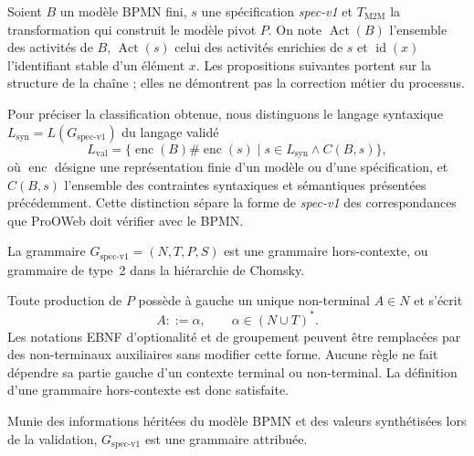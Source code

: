 Soient $B$ un modèle BPMN fini, $s$ une spécification \textit{spec-v1} et
$T_{\mathrm{M2M}}$ la transformation qui construit le modèle pivot $P$. On note
$\operatorname{Act}(B)$ l'ensemble des activités de $B$,
$\operatorname{Act}(s)$ celui des activités enrichies de $s$ et
$\operatorname{id}(x)$ l'identifiant stable d'un élément $x$. Les propositions
suivantes portent sur la structure de la chaîne ; elles ne démontrent pas la
correction métier du processus.

Pour préciser la classification obtenue, nous distinguons le langage syntaxique
$L_{\mathrm{syn}}=L(G_{\text{spec-v1}})$ du langage validé
\[
L_{\mathrm{val}}
=\{\operatorname{enc}(B)\texttt{\#}\operatorname{enc}(s)
\mid s\in L_{\mathrm{syn}}\land C(B,s)\},
\]
où $\operatorname{enc}$ désigne une représentation finie d'un modèle ou d'une
spécification, et $C(B,s)$ l'ensemble des contraintes syntaxiques et sémantiques
présentées précédemment. Cette distinction sépare la forme de \textit{spec-v1}
des correspondances que ProOWeb doit vérifier avec le BPMN.

\begin{proposition}
La grammaire $G_{\text{spec-v1}}=(N,T,P,S)$ est une grammaire hors-contexte, ou
grammaire de type~2 dans la hiérarchie de Chomsky.
\end{proposition}

\begin{preuve}
Toute production de $P$ possède à gauche un unique non-terminal
$A\in N$ et s'écrit
\[
A ::= \alpha,
\qquad \alpha\in(N\cup T)^{*}.
\]
Les notations EBNF d'optionalité et de groupement peuvent être remplacées par des
non-terminaux auxiliaires sans modifier cette forme. Aucune règle ne fait
dépendre sa partie gauche d'un contexte terminal ou non-terminal. La définition
d'une grammaire hors-contexte est donc satisfaite.
\end{preuve}

\begin{proposition}
Munie des informations héritées du modèle BPMN et des valeurs synthétisées lors
de la validation, $G_{\text{spec-v1}}$ est une grammaire attribuée.
\end{proposition}


